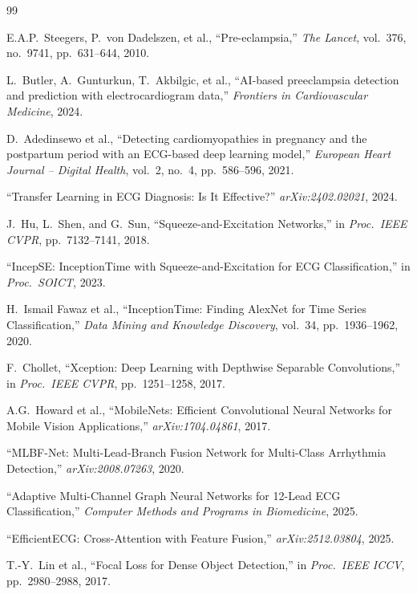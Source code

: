 \documentclass[11pt,a4paper]{article}
\begin{document}
\begin{thebibliography}{99}

E.A.P.\ Steegers, P.\ von Dadelszen, et al.,
``Pre-eclampsia,''
\textit{The Lancet}, vol.~376, no.~9741, pp.~631--644, 2010.

L.\ Butler, A.\ Gunturkun, T.\ Akbilgic, et al.,
``AI-based preeclampsia detection and prediction with electrocardiogram data,''
\textit{Frontiers in Cardiovascular Medicine}, 2024.

D.\ Adedinsewo et al.,
``Detecting cardiomyopathies in pregnancy and the postpartum period with an ECG-based deep learning model,''
\textit{European Heart Journal -- Digital Health}, vol.~2, no.~4, pp.~586--596, 2021.

``Transfer Learning in ECG Diagnosis: Is It Effective?''
\textit{arXiv:2402.02021}, 2024.

J.\ Hu, L.\ Shen, and G.\ Sun,
``Squeeze-and-Excitation Networks,''
in \textit{Proc.\ IEEE CVPR}, pp.~7132--7141, 2018.

``IncepSE: InceptionTime with Squeeze-and-Excitation for ECG Classification,''
in \textit{Proc.\ SOICT}, 2023.

H.\ Ismail Fawaz et al.,
``InceptionTime: Finding AlexNet for Time Series Classification,''
\textit{Data Mining and Knowledge Discovery}, vol.~34, pp.~1936--1962, 2020.

F.\ Chollet,
``Xception: Deep Learning with Depthwise Separable Convolutions,''
in \textit{Proc.\ IEEE CVPR}, pp.~1251--1258, 2017.

A.G.\ Howard et al.,
``MobileNets: Efficient Convolutional Neural Networks for Mobile Vision Applications,''
\textit{arXiv:1704.04861}, 2017.

``MLBF-Net: Multi-Lead-Branch Fusion Network for Multi-Class Arrhythmia Detection,''
\textit{arXiv:2008.07263}, 2020.

``Adaptive Multi-Channel Graph Neural Networks for 12-Lead ECG Classification,''
\textit{Computer Methods and Programs in Biomedicine}, 2025.

``EfficientECG: Cross-Attention with Feature Fusion,''
\textit{arXiv:2512.03804}, 2025.

T.-Y.\ Lin et al.,
``Focal Loss for Dense Object Detection,''
in \textit{Proc.\ IEEE ICCV}, pp.~2980--2988, 2017.


\end{thebibliography}
\end{document}
